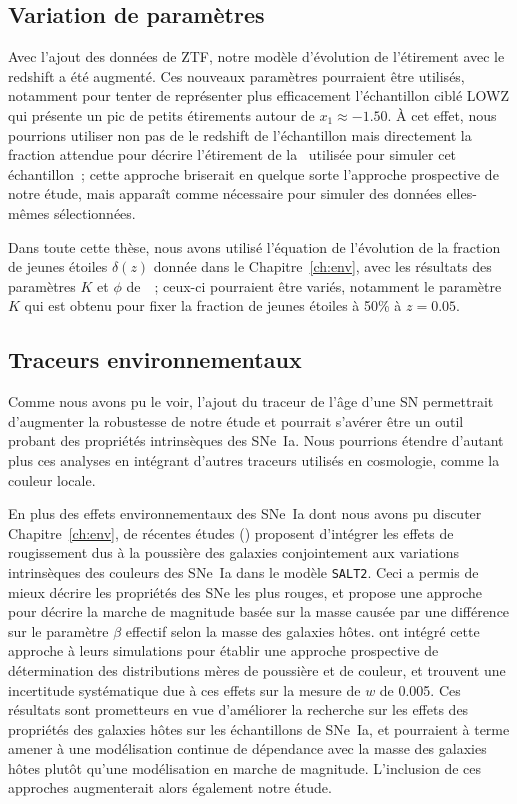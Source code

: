 \documentclass[../main/main.tex]{subfiles}
\begin{document}
\subsection{Variation de paramètres}\label{ssec:pvar}

Avec l'ajout des données de ZTF, notre modèle d'évolution de l'étirement avec le
redshift a été augmenté. Ces nouveaux paramètres pourraient être utilisés,
notamment pour tenter de représenter plus efficacement l'échantillon ciblé LOWZ
qui présente un pic de petits étirements autour de $x_1 \approx -1.50$. À cet
effet, nous pourrions utiliser non pas de le redshift de l'échantillon mais
directement la fraction attendue pour décrire l'étirement de la \hostlib\
utilisée pour simuler cet échantillon~; cette approche briserait en quelque
sorte l'approche prospective de notre étude, mais apparaît comme nécessaire pour
simuler des données elles-mêmes sélectionnées.

Dans toute cette thèse, nous avons utilisé l'équation de l'évolution de la
fraction de jeunes étoiles $\delta(z)$ donnée dans le Chapitre~\ref{ch:env},
avec les résultats des paramètres $K$ et $\phi$ de~\cite{rigault2020}~; ceux-ci
pourraient être variés, notamment le paramètre $K$ qui est obtenu pour fixer la
fraction de jeunes étoiles à 50\% à $z = \num{0.05}$.

\subsection{Traceurs environnementaux}\label{ssec:envtrac}

Comme nous avons pu le voir, l'ajout du traceur de l'âge d'une SN permettrait
d'augmenter la robustesse de notre étude et pourrait s'avérer être un outil
probant des propriétés intrinsèques des SNe~Ia. Nous pourrions étendre d'autant
plus ces analyses en intégrant d'autres traceurs utilisés en cosmologie, comme
la couleur locale.

En plus des effets environnementaux des SNe~Ia dont nous avons pu discuter
Chapitre~\ref{ch:env}, de récentes études (\cite{brout2021}) proposent
d'intégrer les effets de rougissement dus à la poussière des galaxies
conjointement aux variations intrinsèques des couleurs des SNe~Ia dans le modèle
\texttt{SALT2}. Ceci a permis de mieux décrire les propriétés des SNe les plus
rouges, et propose une approche pour décrire la marche de magnitude basée sur la
masse causée par une différence sur le paramètre $\beta$ effectif selon la masse
des galaxies hôtes. \cite{popovic2021b} ont intégré cette approche à leurs
simulations pour établir une approche prospective de détermination des
distributions mères de poussière et de couleur, et trouvent une incertitude
systématique due à ces effets sur la mesure de $w$ de \num{0.005}. Ces résultats
sont prometteurs en vue d'améliorer la recherche sur les effets des propriétés
des galaxies hôtes sur les échantillons de SNe~Ia, et pourraient à terme amener
à une modélisation continue de dépendance avec la masse des galaxies hôtes
plutôt qu'une modélisation en marche de magnitude. L'inclusion de ces approches
augmenterait alors également notre étude.

\clearpage

\thispagestyle{plain}
\vfill
\minilof
\vfill
\minilot
\vfill

% 
% 
\end{document}
